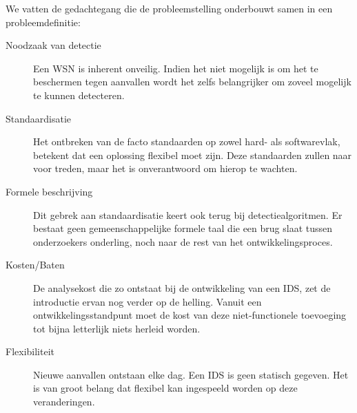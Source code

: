 We vatten de gedachtegang die de probleemstelling onderbouwt samen in een
probleemdefinitie:

\begin{description}

  \item[Noodzaak van detectie] Een WSN is inherent onveilig. Indien het niet
  mogelijk is om het te beschermen tegen aanvallen wordt het zelfs belangrijker
  om zoveel mogelijk te kunnen detecteren.

  \item[Standaardisatie] Het ontbreken van de facto standaarden op zowel hard-
  als softwarevlak, betekent dat een oplossing flexibel moet zijn. Deze
  standaarden zullen naar voor treden, maar het is onverantwoord om hierop te
  wachten.

  \item[Formele beschrijving] Dit gebrek aan standaardisatie keert ook terug
  bij detectiealgoritmen. Er bestaat geen gemeenschappelijke formele taal die
  een brug slaat tussen onderzoekers onderling, noch naar de rest van het
  ontwikkelingsproces.

  \item[Kosten/Baten] De analysekost die zo ontstaat bij de ontwikkeling van
  een IDS, zet de introductie ervan nog verder op de helling. Vanuit een
  ontwikkelingsstandpunt moet de kost van deze niet-functionele toevoeging tot
  bijna letterlijk niets herleid worden.

  \item[Flexibiliteit] Nieuwe aanvallen ontstaan elke dag. Een IDS is geen
  statisch gegeven. Het is van groot belang dat flexibel kan ingespeeld worden
  op deze veranderingen.

\end{description}

